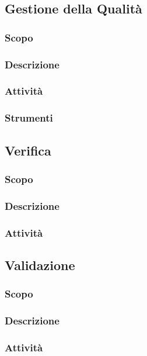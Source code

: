     \subsection{Gestione della Qualità}
        \subsubsection{Scopo}
        \subsubsection{Descrizione}
        \subsubsection{Attività}
        \subsubsection{Strumenti}
    \subsection{Verifica}
        \subsubsection{Scopo}
        \subsubsection{Descrizione}
        \subsubsection{Attività}
    \subsection{Validazione}
        \subsubsection{Scopo}
        \subsubsection{Descrizione}
        \subsubsection{Attività}